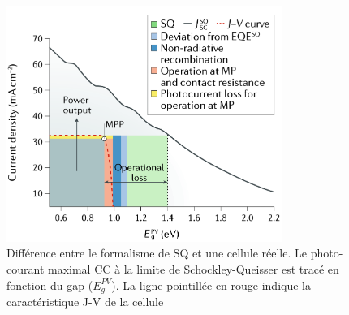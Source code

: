 \begin{figure}
  \begin{center}
    \includegraphics[width=0.8\textwidth]{resources/natsq.png}
    \caption{Différence entre le formalisme de SQ et une cellule réelle. Le photo-courant maximal CC à la limite de Schockley-Queisser est tracé en fonction du gap ($E_{g}^{PV}$). La ligne pointillée en rouge indique la caractéristique J-V de la cellule \cite{nayak2019}}
    \label{fig:natsq}
  \end{center}
\end{figure}
